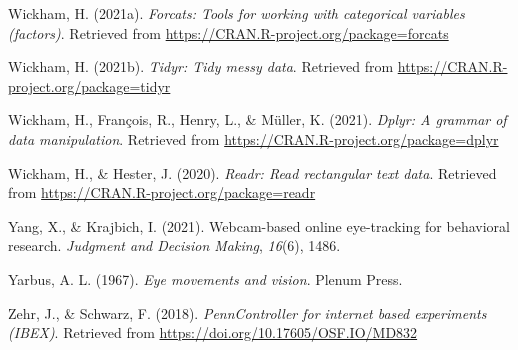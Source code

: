 \documentclass[
  man,floatsintext]{apa6}
\newlength{\cslhangindent}
\newlength{\cslentryspacingunit} %
\newenvironment{CSLReferences}[2] %
 {%
  \setlength{\parindent}{0pt}
  \ifodd #1
  \let\oldpar\par
  \def\par{\hangindent=\cslhangindent\oldpar}
  \fi
  \setlength{\parskip}{#2\cslentryspacingunit}
 }%
 {}
\begin{document}
\begin{CSLReferences}{1}{0}
\leavevmode{}%
Wickham, H. (2021a). \emph{Forcats: Tools for working with categorical variables (factors)}. Retrieved from \url{https://CRAN.R-project.org/package=forcats}

\leavevmode{}%
Wickham, H. (2021b). \emph{Tidyr: Tidy messy data}. Retrieved from \url{https://CRAN.R-project.org/package=tidyr}

\leavevmode{}%
Wickham, H., François, R., Henry, L., \& Müller, K. (2021). \emph{Dplyr: A grammar of data manipulation}. Retrieved from \url{https://CRAN.R-project.org/package=dplyr}

\leavevmode{}%
Wickham, H., \& Hester, J. (2020). \emph{Readr: Read rectangular text data}. Retrieved from \url{https://CRAN.R-project.org/package=readr}

\leavevmode{}%
Yang, X., \& Krajbich, I. (2021). Webcam-based online eye-tracking for behavioral research. \emph{Judgment and Decision Making}, \emph{16}(6), 1486.

\leavevmode{}%
Yarbus, A. L. (1967). \emph{Eye movements and vision}. Plenum Press.

\leavevmode{}%
Zehr, J., \& Schwarz, F. (2018). \emph{PennController for internet based experiments (IBEX)}. Retrieved from \url{https://doi.org/10.17605/OSF.IO/MD832}

\end{CSLReferences}

\endgroup
\end{document}
